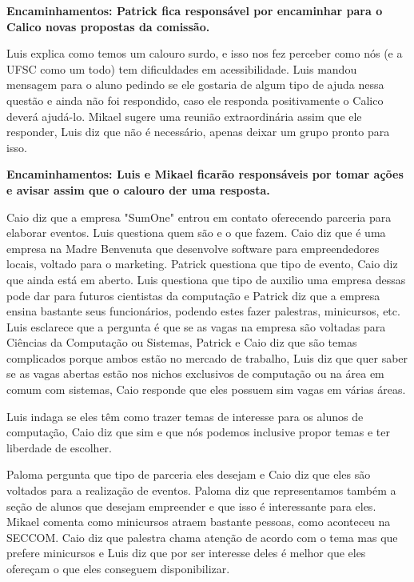 \documentclass{ata-calico}
\begin{document}
 \textbf{Encaminhamentos: Patrick fica responsável por encaminhar para o Calico novas propostas da comissão.}

Luis explica como temos um calouro surdo, e isso nos fez perceber como nós (e a UFSC como um todo) tem dificuldades em acessibilidade. Luis mandou mensagem para o aluno pedindo se ele gostaria de algum tipo de ajuda nessa questão e ainda não foi respondido, caso ele responda positivamente o Calico deverá ajudá-lo. Mikael sugere uma reunião extraordinária assim que ele responder, Luis diz que não é necessário, apenas deixar um grupo pronto para isso.\newline

\textbf{Encaminhamentos: Luis e Mikael ficarão responsáveis por tomar ações e avisar assim que o calouro der uma resposta.}


Caio diz que a empresa "SumOne" entrou em contato oferecendo parceria para elaborar eventos. Luis questiona quem são e o que fazem. Caio diz que é uma empresa na Madre Benvenuta que desenvolve software para empreendedores locais, voltado para o marketing. Patrick questiona que tipo de evento, Caio diz que ainda está em aberto. Luis questiona que tipo de auxilio uma empresa dessas pode dar para futuros cientistas da computação e Patrick diz que a empresa ensina bastante seus funcionários, podendo estes fazer palestras, minicursos, etc. Luis esclarece que a pergunta é que se as vagas na empresa são voltadas para Ciências da Computação ou Sistemas, Patrick e Caio diz que são temas complicados porque ambos estão no mercado de trabalho, Luis diz que quer saber se as vagas abertas estão nos nichos exclusivos de computação ou na área em comum com sistemas, Caio responde que eles possuem sim vagas em várias áreas. 

Luis indaga se eles têm como trazer temas de interesse para os alunos de computação, Caio diz que sim e que nós podemos inclusive propor temas e ter liberdade de escolher. 

Paloma pergunta que tipo de parceria eles desejam e Caio diz que eles são voltados para a realização de eventos. Paloma diz que representamos também a seção de alunos que desejam empreender e que isso é interessante para eles. Mikael comenta como minicursos atraem bastante pessoas, como aconteceu na SECCOM. Caio diz que palestra chama atenção de acordo com o tema mas que prefere minicursos e Luis diz que por ser interesse deles é melhor que eles ofereçam o que eles conseguem disponibilizar.\newline
\end{document}
